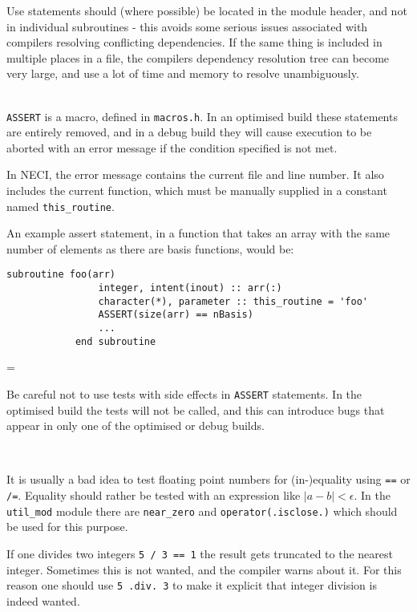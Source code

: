 \documentclass[a4paper,notitlepage,dvipsnames]{scrreprt}
\newcommand\headitem[1]{\needspace{1.5\baselineskip}\item[{\boldmath #1 \nopagebreak}] \hfill \\ \nopagebreak}
\let\code\lstinline
\newenvironment{warningbox}
	{\par\begin{mdframed}[%
		linewidth = 2pt, %
	    linecolor = red, %
	    roundcorner = 6pt, %
		backgroundcolor = gray!20
	]\begin{list}{}{\leftmargin=1cm
			           \labelwidth=\leftmargin}\item[\Large\ding{43}]}
	{\end{list}\end{mdframed}\par}
\begin{document}
\begin{description}
		Use statements should
		(where possible) be located in the module header, and not in
		individual subroutines - this avoids some serious issues associated
		with compilers resolving conflicting dependencies. If the same thing
		is included in multiple places in a file, the compilers dependency
		resolution tree can become very large, and use a lot of time and
		memory to resolve unambiguously.

	\headitem{{\ttfamily ASSERT} statements}
		\code{ASSERT} is a macro, defined in \code{macros.h}. In
		an optimised build these statements are entirely removed, and in a
		debug build they will cause execution to be aborted with an error
		message if the condition specified is not met.

		In NECI, the error message contains the current file and line number.
		It also includes the current function, which must be manually supplied
		in a constant named \code{this_routine}.

		An example assert statement, in a function that takes an array with
		the same number of elements as there are basis functions, would be:
		\begin{lstlisting}[gobble=8]
			subroutine foo(arr)
				integer, intent(inout) :: arr(:)
				character(*), parameter :: this_routine = 'foo'
				ASSERT(size(arr) == nBasis)
				...
			end subroutine
		\end{lstlisting}

		\begin{warningbox}
			Be careful not to use tests with side effects in \code{ASSERT}
			statements. In the optimised build the tests will not be called,
			and this can introduce bugs that appear in only one of the
			optimised or debug builds.
		\end{warningbox}

	\headitem{Floating point comparison and integer division}

    It is usually a bad idea to test floating point numbers
    for (in-)equality using \code{==} or \code{/=}.
    Equality should rather be tested with an expression like
    $ |a - b| < \epsilon$.
    In the \code{util_mod} module there are \code{near_zero}
    and \code{operator(.isclose.)} which should be used for this purpose.

    If one divides two integers \code{5 / 3 == 1} the result gets truncated
    to the nearest integer.
    Sometimes this is not wanted, and the compiler warns about it.
    For this reason one should use \code{5 .div. 3} to make it explicit
    that integer division is indeed wanted.


\end{description}
\end{document}
